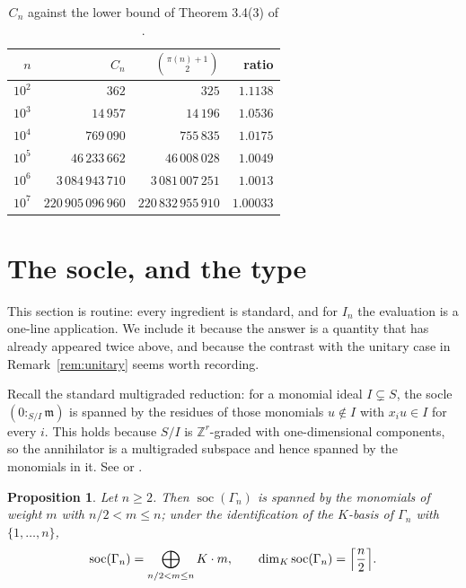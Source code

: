 \documentclass[a4paper,11pt,oneside,reqno]{amsart}
\theoremstyle{definition}
\theoremstyle{remark}
\theoremstyle{plain}
\newtheorem{proposition}[definition]{Proposition}
\newcommand{\ZZ}{\mathbb{Z}}
\newcommand{\Gam}{\Gamma}
\begin{document}
\begin{table}[ht]
  \centering
  \begin{tabular}{rrrr}
    \toprule
    \(n\) & \(C_n\) & \(\binom{\pi(n)+1}{2}\) & ratio \\
    \midrule
    \(10^{2}\) & \(362\) & \(325\) & \(1.1138\) \\
    \(10^{3}\) & \(14\,957\) & \(14\,196\) & \(1.0536\) \\
    \(10^{4}\) & \(769\,090\) & \(755\,835\) & \(1.0175\) \\
    \(10^{5}\) & \(46\,233\,662\) & \(46\,008\,028\) & \(1.0049\) \\
    \(10^{6}\) & \(3\,084\,943\,710\) & \(3\,081\,007\,251\) & \(1.0013\) \\
    \(10^{7}\) & \(220\,905\,096\,960\) & \(220\,832\,955\,910\) & \(1.00033\) \\
    \bottomrule
  \end{tabular}
  \caption{\(C_n\) against the lower bound of Theorem 3.4(3) of
    \cite{Snellman2000}.}\label{tab:err}
\end{table}

\section{The socle, and the type}\label{sec:socle}

This section is routine: every ingredient is standard, and for \(I_n\) the
evaluation is a one-line application. We include it because the answer is a
quantity that has already appeared twice above, and because the contrast with
the unitary case in Remark~\ref{rem:unitary} seems worth recording.

Recall the standard multigraded reduction: for a monomial ideal \(I \subsetneq S\),
the socle \((0:_{S/I}\mathfrak m)\) is spanned by the residues of those
monomials \(u \notin I\) with \(x_iu \in I\) for every \(i\). This holds because
\(S/I\) is \(\ZZ^{r}\)-graded with one-dimensional components, so the
annihilator is a multigraded subspace and hence spanned by the monomials in it. See
\cite{HerzogHibi} or \cite{MillerSturmfels}.

\begin{proposition}\label{prop:socle}
  Let \(n \ge 2\). Then \(\operatorname{soc}(\Gam_n)\) is spanned by the
  monomials of weight \(m\) with \(n/2 < m \le n\); under the identification of
  the \(K\)-basis of \(\Gam_n\) with \(\{1,\dots,n\}\),
  \begin{equation}\label{eq:socle}
    \operatorname{soc}(\Gam_n) = \bigoplus_{n/2 < m \le n}K \cdot m,
    \qquad
    \dim_K\operatorname{soc}(\Gam_n) = \Bigl\lceil\frac{n}{2}\Bigr\rceil .
  \end{equation}
\end{proposition}
\end{document}

